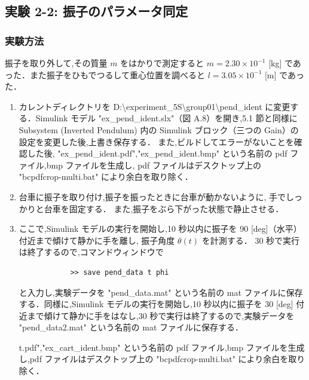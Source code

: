 \subsection{実験 2-2: 振子のパラメータ同定}
\subsubsection{実験方法}

振子を取り外して,その質量 \( m \) をはかりで測定すると \( m = 2.30 \times 10^{-1} \) [kg] であった．また振子をひもでつるして重心位置を調べると \( l = 3.05 \times 10^{-1} \) [m] であった．

\begin{enumerate}
  \item カレントディレクトリを D:\textbackslash experiment\_5S\textbackslash group01\textbackslash pend\_ident に変更する．Simulink モデル "ex\_pend\_ident.slx"（図 A.8）を開き,5.1 節と同様に Subsystem (Inverted Pendulum) 内の Simulink ブロック（三つの Gain）の設定を変更した後,上書き保存する．
        また,ビルドしてエラーがないことを確認した後,
        "ex\_pend\_ident.pdf","ex\_pend\_ident.bmp" 
        という名前の pdf ファイル,bmp ファイルを生成し,
        pdf ファイルはデスクトップ上の "bcpdfcrop-multi.bat" 
        により余白を取り除く．
        
  \item 台車に振子を取り付け,振子を振ったときに台車が動かないように,
        手でしっかりと台車を固定する．
        また,振子をぶら下がった状態で静止させる．
        
  \item ここで,Simulink モデルの実行を開始し,10 秒以内に振子を 90 [deg]（水平）付近まで傾けて静かに手を離し,
        振子角度 \( \theta(t) \) を計測する．
        30 秒で実行は終了するので,コマンドウィンドウで
        \begin{tcolorbox}[colback=gray!5!white,colframe=gray!75!black]
          \begin{lstlisting}
            >> save pend_data t phi
            \end{lstlisting}
        \end{tcolorbox}
        と入力し,実験データを "pend\_data.mat" という名前の mat ファイルに保存する．同様に,Simulink モデルの実行を開始し,10 秒以内に振子を 30 [deg] 付近まで傾けて静かに手をはなし,30 秒で実行は終了するので,実験データを "pend\_data2.mat" という名前の mat ファイルに保存する．
        
        t.pdf","ex\_cart\_ident.bmp" という名前の pdf ファイル,bmp ファイルを生成し,pdf ファイルはデスクトップ上の "bcpdfcrop-multi.bat" により余白を取り除く．
\end{enumerate}

